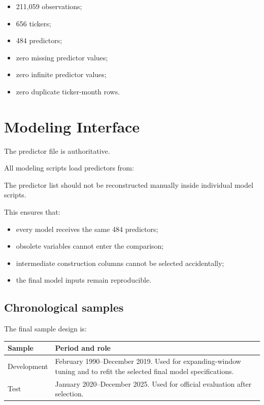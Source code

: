 \documentclass[11pt,a4paper]{article}
\begin{document}
\begin{itemize}
  \item 211,059 observations;
  \item 656 tickers;
  \item 484 predictors;
  \item zero missing predictor values;
  \item zero infinite predictor values;
  \item zero duplicate ticker-month rows.
\end{itemize}


\section{Modeling Interface}

The predictor file is authoritative.

All modeling scripts load predictors from:

\begin{center}
\end{center}

The predictor list should not be reconstructed manually inside individual
model scripts.

This ensures that:

\begin{itemize}
  \item every model receives the same 484 predictors;
  \item obsolete variables cannot enter the comparison;
  \item intermediate construction columns cannot be selected accidentally;
  \item the final model inputs remain reproducible.
\end{itemize}

\subsection{Chronological samples}

The final sample design is:

\begin{center}
\small
\begin{tabularx}{0.94\textwidth}{p{3.2cm}Y}
\toprule
Sample & Period and role \\
\midrule

Development
&
February 1990--December 2019. Used for expanding-window tuning and to refit the
selected final model specifications.
\\

Test
&
January 2020--December 2025. Used for official evaluation after selection.
\\

\bottomrule
\end{tabularx}
\end{center}
\end{document}
